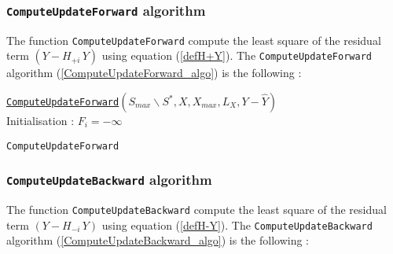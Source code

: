 \newpage
\subsubsection{\texttt{ComputeUpdateForward} algorithm}

 The function \texttt{ComputeUpdateForward} compute the least square of the residual term $(Y-H_{+i}\,Y)$ using equation (\ref{defH+Y}).
 The \texttt{ComputeUpdateForward} algorithm (\ref{ComputeUpdateForward_algo}) is the following :

\begin{algorithm}
\label{ComputeUpdateForward_algo}
\underline{\texttt{ComputeUpdateForward}}$(S_{max} \backslash S^*,X,X_{max},L_X,Y-\hat{Y})$\\
\BlankLine
Initialisation : $F_i = -\infty$
\BlankLine
{}
\caption{\texttt{ComputeUpdateForward} }
\end{algorithm}

\subsubsection{\texttt{ComputeUpdateBackward} algorithm}

The function \texttt{ComputeUpdateBackward} compute the least square of the residual term  $(Y-H_{-i}\,Y)$ using equation (\ref{defH-Y}).
 The \texttt{ComputeUpdateBackward} algorithm (\ref{ComputeUpdateBackward_algo}) is the following :


